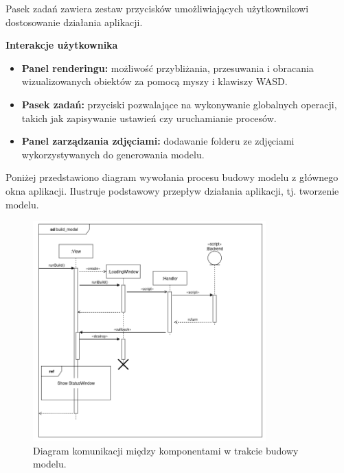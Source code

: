 Pasek zadań zawiera zestaw przycisków umożliwiających użytkownikowi dostosowanie działania aplikacji. 

\textbf{Interakcje użytkownika}
\begin{itemize}
    \item \textbf{Panel renderingu:} możliwość przybliżania, przesuwania i obracania wizualizowanych obiektów za pomocą myszy i klawiszy WASD.
    \item \textbf{Pasek zadań:} przyciski pozwalające na wykonywanie globalnych operacji, takich jak zapisywanie ustawień czy uruchamianie procesów.
    \item \textbf{Panel zarządzania zdjęciami:} dodawanie folderu ze zdjęciami wykorzystywanych do generowania modelu.
\end{itemize}

Poniżej przedstawiono diagram wywołania procesu budowy modelu z głównego okna aplikacji. Ilustruje podstawowy przepływ działania aplikacji, tj. tworzenie modelu.

\begin{figure}[h!]
    \centering
    \includegraphics[width=0.8\textwidth]{img/diagramy/diagram_sekw_build.png}
    \caption{Diagram komunikacji między komponentami w trakcie budowy modelu.}
\end{figure}

